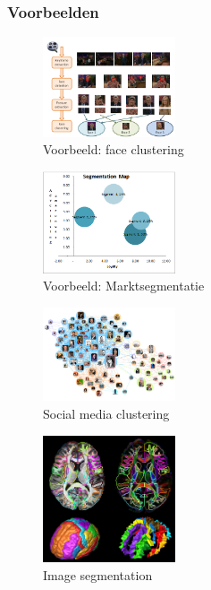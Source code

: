 \documentclass{article}
\begin{document}
\subsubsection{Voorbeelden}

\begin{figure}[H]
    \centering
    \includegraphics[width=0.35\textwidth]{clustering-voorbeeld.png}
    \caption{Voorbeeld: face clustering}
\end{figure}

\begin{figure}[H]
    \centering
    \includegraphics[width=0.35\textwidth]{clustering-marktsegmentatie.png}
    \caption{Voorbeeld: Marktsegmentatie}
\end{figure}

\begin{figure}[H]
    \centering
    \includegraphics[width=0.35\textwidth]{clustering-socialmedia.png}
    \caption{Social media clustering}
\end{figure}

\begin{figure}[H]
    \centering
    \includegraphics[width=0.35\textwidth]{clustering-image-segmentation.png}
    \caption{Image segmentation}
\end{figure}
\end{document}
